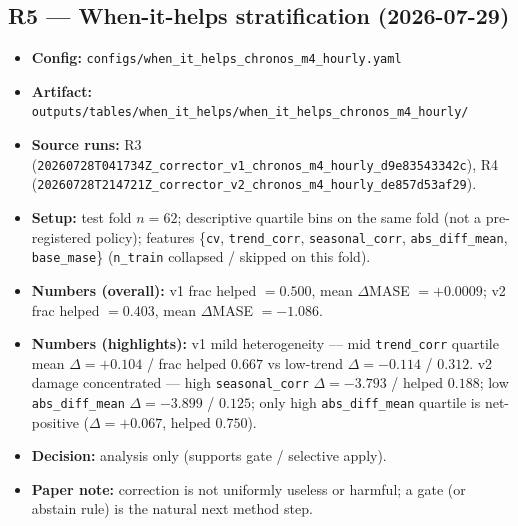 \subsection*{R5 --- When-it-helps stratification (2026-07-29)}
\begin{itemize}
  \item \textbf{Config:} \texttt{configs/when\_it\_helps\_chronos\_m4\_hourly.yaml}
  \item \textbf{Artifact:}
        \texttt{outputs/tables/when\_it\_helps/when\_it\_helps\_chronos\_m4\_hourly/}
  \item \textbf{Source runs:} R3
        (\texttt{20260728T041734Z\_corrector\_v1\_chronos\_m4\_hourly\_d9e83543342c}),
        R4
        (\texttt{20260728T214721Z\_corrector\_v2\_chronos\_m4\_hourly\_de857d53af29}).
  \item \textbf{Setup:} test fold $n=62$; descriptive quartile bins on the same
        fold (not a pre-registered policy); features
        \{\texttt{cv}, \texttt{trend\_corr}, \texttt{seasonal\_corr},
        \texttt{abs\_diff\_mean}, \texttt{base\_mase}\}
        (\texttt{n\_train} collapsed / skipped on this fold).
  \item \textbf{Numbers (overall):} v1 frac helped $=0.500$, mean $\Delta$MASE
        $=+0.0009$; v2 frac helped $=0.403$, mean $\Delta$MASE $=-1.086$.
  \item \textbf{Numbers (highlights):} v1 mild heterogeneity --- mid
        \texttt{trend\_corr} quartile mean $\Delta=+0.104$ / frac helped
        $0.667$ vs low-trend $\Delta=-0.114$ / $0.312$.
        v2 damage concentrated --- high \texttt{seasonal\_corr} $\Delta=-3.793$
        / helped $0.188$; low \texttt{abs\_diff\_mean} $\Delta=-3.899$ / $0.125$;
        only high \texttt{abs\_diff\_mean} quartile is net-positive
        ($\Delta=+0.067$, helped $0.750$).
  \item \textbf{Decision:} analysis only (supports gate / selective apply).
  \item \textbf{Paper note:} correction is not uniformly useless or harmful;
        a gate (or abstain rule) is the natural next method step.
\end{itemize}

